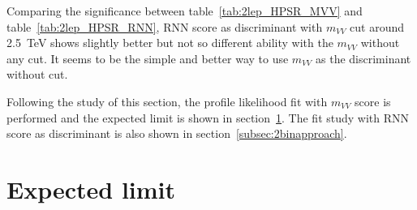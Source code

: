 \begin{table}[ht!]
\small
\begin{center}
\caption{Best cut point table for binned significance for RNN score distribution in \tlep channel LPSR}
\label{tab:2lep_LPSR_RNN}
\end{center}
\end{table}

Comparing the significance between table~\ref{tab:2lep_HPSR_MVV} and table~\ref{tab:2lep_HPSR_RNN}, 
RNN score as discriminant with $m_{VV}$ cut around 2.5~TeV shows slightly better but not so different ability with the $m_{VV}$ without any cut.
It seems to be the simple and better way to use $m_{VV}$ as the discriminant without cut. 

Following the study of this section, the profile likelihood fit with $m_{VV}$ score is performed and the expected limit is shown in section~\ref{subsec:aqgc_limit}. The fit study with RNN score as discriminant is also shown in section~\ref{subsec:2binapproach}.

\section{Expected limit}
\label{subsec:aqgc_limit}

